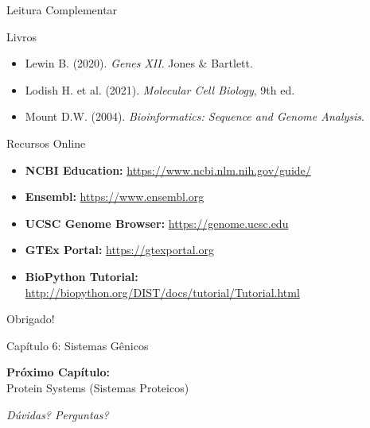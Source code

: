 \begin{frame}[allowframebreaks]{Leitura Complementar}
\begin{block}{Livros}
\begin{itemize}
    \item Lewin B. (2020). \textit{Genes XII}. Jones \& Bartlett.
    \item Lodish H. et al. (2021). \textit{Molecular Cell Biology}, 9th ed.
    \item Mount D.W. (2004). \textit{Bioinformatics: Sequence and Genome Analysis}.
\end{itemize}
\end{block}

\begin{block}{Recursos Online}
\begin{itemize}
    \item \textbf{NCBI Education:} \url{https://www.ncbi.nlm.nih.gov/guide/}
    \item \textbf{Ensembl:} \url{https://www.ensembl.org}
    \item \textbf{UCSC Genome Browser:} \url{https://genome.ucsc.edu}
    \item \textbf{GTEx Portal:} \url{https://gtexportal.org}
    \item \textbf{BioPython Tutorial:} \url{http://biopython.org/DIST/docs/tutorial/Tutorial.html}
\end{itemize}
\end{block}
\end{frame}

\begin{frame}{}
\begin{center}
{\Huge Obrigado!}

\vspace{1cm}

{\Large Capítulo 6: Sistemas Gênicos}

\vspace{1cm}

\textbf{Próximo Capítulo:}\\
Protein Systems (Sistemas Proteicos)

\vspace{1cm}

\textit{Dúvidas? Perguntas?}
\end{center}
\end{frame}


